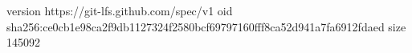 version https://git-lfs.github.com/spec/v1
oid sha256:ce0cb1e98ca2f9db1127324f2580bcf69797160fff8ca52d941a7fa6912fdaed
size 145092
